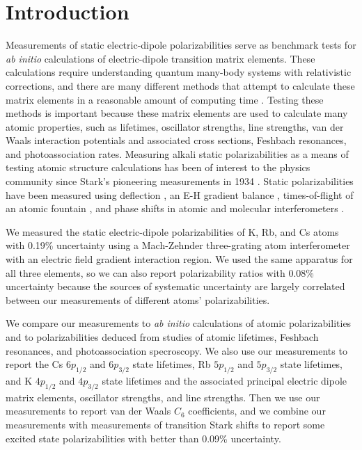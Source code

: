 \documentclass[twocolumn,pra,showpacs,superscriptaddress,longbibliography]{revtex4-1}   %
\begin{document}



\maketitle



\section{Introduction} \label{sectionIntroduction}

Measurements of static electric-dipole polarizabilities serve as benchmark tests for \textit{ab initio} calculations of electric-dipole transition matrix elements. 
These calculations require understanding quantum many-body systems with relativistic corrections, and there are many different methods that attempt to calculate these matrix elements in a reasonable amount of computing time \cite{Mitroy2010}. Testing these methods is important because these matrix elements are used to calculate many atomic properties, such as lifetimes, oscillator strengths, line strengths, van der Waals interaction potentials and associated cross sections, Feshbach resonances, and photoassociation rates.
Measuring alkali static polarizabilities as a means of testing atomic 
structure calculations has been of interest to the physics community since
Stark's pioneering measurements in 1934 \cite{Scheffers1934}. Static polarizabilities have been measured using deflection \cite{Scheffers1934,Chamberlain1963,Hall1974,Ma2015}, an E-H gradient
balance \cite{Salop1961,Molof1974a}, times-of-flight of an atomic fountain \cite{Amini2003}, and phase shifts in atomic and molecular interferometers
\cite{Ekstrom1995,Miffre2006,Holmgren2010,Berninger2007}.

We measured the static electric-dipole polarizabilities of K, Rb, and Cs atoms with 0.19\% uncertainty using a Mach-Zehnder three-grating atom interferometer \cite{Berman1997,Cronin2009} with an electric field gradient interaction region. We used the same apparatus for all three elements, so we can also report polarizability ratios with 0.08\% uncertainty because the sources of systematic uncertainty are largely correlated between our measurements of different atoms' polarizabilities. 

We compare our measurements to
\textit{ab initio} calculations of atomic polarizabilities and to polarizabilities deduced from studies of atomic lifetimes, Feshbach resonances, and photoassociation specroscopy. We also use our measurements to report the Cs $6p_{1/2}$ and $6p_{3/2}$ state lifetimes, Rb $5p_{1/2}$ and $5p_{3/2}$ state lifetimes, and K $4p_{1/2}$ and $4p_{3/2}$ state lifetimes and the associated principal electric dipole matrix elements, oscillator strengths, and line strengths. 
Then we use our measurements to report van der Waals $C_6$ coefficients,
and we combine our measurements with measurements of 
transition Stark shifts to report some excited state polarizabilities with better than 0.09\% uncertainty.
\end{document}

